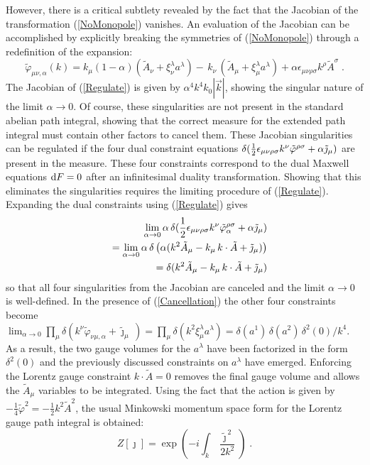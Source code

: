 \documentclass[a4paper,a4paper]{article}
\begin{document}
However, there is a critical subtlety revealed by the fact that the Jacobian of the transformation (\ref{NoMonopole}) vanishes.  An evaluation of the Jacobian can be accomplished by explicitly breaking the symmetries of (\ref{NoMonopole}) through a redefinition of the expansion:
\begin{equation}
\label{Regulate}
\tilde{\varphi}_{\mu \nu, \alpha} (k)  =   k_\mu (1 - \alpha )( \tilde{A}_\nu  + \xi^\lambda_\nu a^\lambda )  - \, k_\nu \, (  \tilde{A}_\mu  + \xi^\lambda_\mu a^\lambda ) +  \alpha \epsilon_{\mu \nu \rho \sigma} k^\rho  \tilde{A}^\sigma \; .
\end{equation}
The Jacobian of (\ref{Regulate}) is given by $\alpha^4 k^4 k_0 |\vec{k}|$, showing the singular nature of the limit $\alpha \rightarrow 0$.  Of course, these singularities are not present in the standard abelian path integral, showing that the correct measure for the extended path integral must contain other factors to cancel them.  These Jacobian singularities can be regulated if the four dual constraint equations $\delta ( {\small \frac{1}{2}} \epsilon_{\mu \nu \rho \sigma} k^\nu \tilde{\varphi}^{\rho \sigma} + \alpha \tilde{\jmath}_\mu )$ are present in the measure.  These four constraints correspond to the dual Maxwell equations ${\rm d}F = 0$ after an infinitesimal duality transformation.  Showing that this eliminates the singularities requires the limiting procedure of (\ref{Regulate}).  Expanding the dual constraints using (\ref{Regulate}) gives
\begin{eqnarray}
\label{Cancellation}
& &   \lim_{\alpha \rightarrow 0} \alpha \, \delta( {\small \frac{1}{2}} \epsilon_{\mu \nu \rho \sigma} k^\nu \tilde{\varphi}^{\rho \sigma}_\alpha + \alpha \tilde{\jmath}_\mu ) \nonumber \\
& & = \lim_{\alpha \rightarrow 0} \alpha \, \delta \left( \alpha ( k^2 \tilde{A}_\mu - k_\mu \, k \cdot \tilde{A} + \tilde{\jmath}_\mu ) \right) \nonumber \\
& & = \delta ( k^2 \tilde{A}_\mu - k_\mu \, k \cdot \tilde{A} + \tilde{\jmath}_\mu )
\end{eqnarray}
so that all four singularities from the Jacobian are canceled and the limit $\alpha \rightarrow 0$ is well-defined. In the presence of (\ref{Cancellation}) the other four constraints become $\lim_{\alpha \rightarrow 0} \prod_\mu \delta( k^\nu \tilde{\varphi}_{\nu \mu , \alpha} + \tilde{\jmath}_\mu \,) = \prod_\mu \delta ( k^2 \xi^\lambda_\mu a^\lambda ) = \delta( a^1 ) \, \delta ( a^2 ) \, \delta^2 ( 0 ) / k^4$. As a result, the two gauge volumes for the $a^\lambda$ have been factorized in the form $\delta^2(0)$ and the previously discussed constraints on $a^\lambda$ have emerged. Enforcing the Lorentz gauge constraint $k \cdot \tilde{A} = 0$ removes the final gauge volume and allows the $\tilde{A}_\mu$ variables to be integrated. Using the fact that the action is given by $- \frac{1}{4} \tilde{\varphi}^2 =  - \frac{1}{2} k^2 \tilde{A}^2$, the usual Minkowski momentum space form for the Lorentz gauge path integral is obtained:
\begin{equation}
\label{LorentzGauge}
Z [\jmath] = \exp \left( -  i \int_k  \frac{ \tilde{\jmath}^{\, 2} }{2 k^2} \right) \; .
\end{equation}
\end{document}
